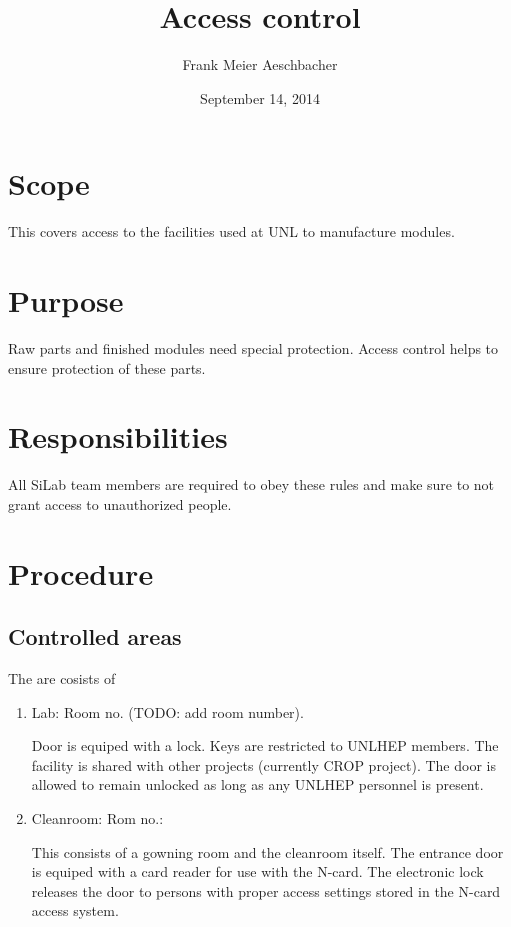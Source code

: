 \documentclass[12pt]{unlsilabsop}
\title{Access control}
\date{September 14, 2014}
\author{Frank Meier Aeschbacher}
\begin{document}
\maketitle

\section{Scope}
This covers access to the facilities used at UNL to manufacture modules.

\section{Purpose}
Raw parts and finished modules need special protection. Access control helps to ensure protection of these parts.


\section{Responsibilities}
All SiLab team members are required to obey these rules and make sure to not grant access to unauthorized people.

\section{Procedure}

\subsection{Controlled areas}
The are cosists of
\begin{enumerate}
    \item Lab: Room no. (TODO: add room number).

    Door is equiped with a lock. Keys are restricted to UNLHEP members. The facility is shared with other projects (currently CROP project). The door is allowed to remain unlocked as long as any UNLHEP personnel is present.
    \item Cleanroom: Rom no.: 

    This consists of a gowning room and the cleanroom itself. The entrance door is equiped with a card reader for use with the N-card. The electronic lock releases the door to persons with proper access settings stored in the N-card access system.
\end{enumerate}
\end{document}
